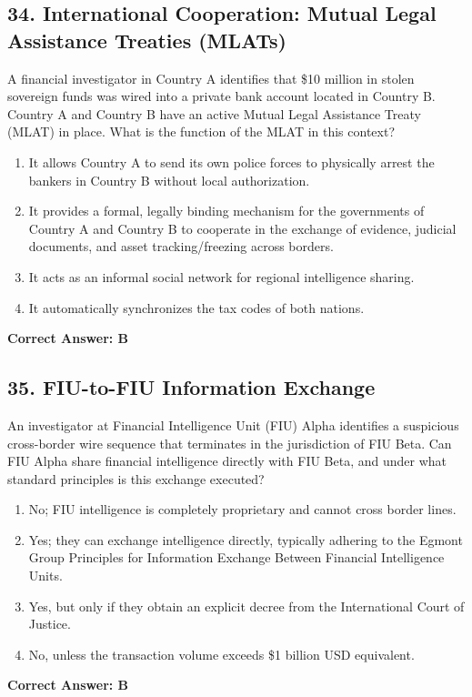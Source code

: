 \documentclass[11pt,a4paper]{article}
\begin{document}
	\subsection{34. International Cooperation: Mutual Legal Assistance Treaties (MLATs)}
	A financial investigator in Country A identifies that \$10 million in stolen sovereign funds was wired into a private bank account located in Country B. Country A and Country B have an active Mutual Legal Assistance Treaty (MLAT) in place. What is the function of the MLAT in this context?
	\begin{enumerate}[label=\Alph*.]
		\item It allows Country A to send its own police forces to physically arrest the bankers in Country B without local authorization.
		\item It provides a formal, legally binding mechanism for the governments of Country A and Country B to cooperate in the exchange of evidence, judicial documents, and asset tracking/freezing across borders.
		\item It acts as an informal social network for regional intelligence sharing.
		\item It automatically synchronizes the tax codes of both nations.
	\end{enumerate}
	\textbf{Correct Answer: B}
	
	\subsection{35. FIU-to-FIU Information Exchange}
	An investigator at Financial Intelligence Unit (FIU) Alpha identifies a suspicious cross-border wire sequence that terminates in the jurisdiction of FIU Beta. Can FIU Alpha share financial intelligence directly with FIU Beta, and under what standard principles is this exchange executed?
	\begin{enumerate}[label=\Alph*.]
		\item No; FIU intelligence is completely proprietary and cannot cross border lines.
		\item Yes; they can exchange intelligence directly, typically adhering to the Egmont Group Principles for Information Exchange Between Financial Intelligence Units.
		\item Yes, but only if they obtain an explicit decree from the International Court of Justice.
		\item No, unless the transaction volume exceeds \$1 billion USD equivalent.
	\end{enumerate}
	\textbf{Correct Answer: B}
	
\end{document}
